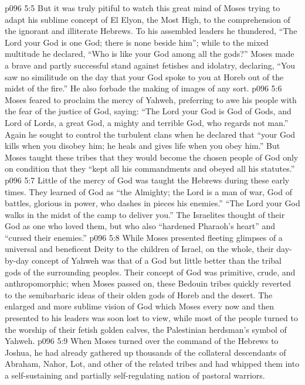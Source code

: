 \vs p096 5:5 \pc But it was truly pitiful to watch this great mind of Moses trying to adapt his sublime concept of El Elyon, the Most High, to the comprehension of the ignorant and illiterate Hebrews. To his assembled leaders he thundered, “The Lord your God is one God; there is none beside him”; while to the mixed multitude he declared, “Who is like your God among all the gods?” Moses made a brave and partly successful stand against fetishes and idolatry, declaring, “You saw no similitude on the day that your God spoke to you at Horeb out of the midst of the fire.” He also forbade the making of images of any sort.
\vs p096 5:6 Moses feared to proclaim the mercy of Yahweh, preferring to awe his people with the fear of the justice of God, saying: “The Lord your God is God of Gods, and Lord of Lords, a great God, a mighty and terrible God, who regards not man.” Again he sought to control the turbulent clans when he declared that “your God kills when you disobey him; he heals and gives life when you obey him.” But Moses taught these tribes that they would become the chosen people of God only on condition that they “kept all his commandments and obeyed all his statutes.”
\vs p096 5:7 Little of the mercy of God was taught the Hebrews during these early times. They learned of God as “the Almighty; the Lord is a man of war, God of battles, glorious in power, who dashes in pieces his enemies.” “The Lord your God walks in the midst of the camp to deliver you.” The Israelites thought of their God as one who loved them, but who also “hardened Pharaoh’s heart” and “cursed their enemies.”
\vs p096 5:8 While Moses presented fleeting glimpses of a universal and beneficent Deity to the children of Israel, on the whole, their day\hyp{}by\hyp{}day concept of Yahweh was that of a God but little better than the tribal gods of the surrounding peoples. Their concept of God was primitive, crude, and anthropomorphic; when Moses passed on, these Bedouin tribes quickly reverted to the semibarbaric ideas of their olden gods of Horeb and the desert. The enlarged and more sublime vision of God which Moses every now and then presented to his leaders was soon lost to view, while most of the people turned to the worship of their fetish golden calves, the Palestinian herdsman’s symbol of Yahweh.
\vs p096 5:9 \pc When Moses turned over the command of the Hebrews to Joshua, he had already gathered up thousands of the collateral descendants of Abraham, Nahor, Lot, and other of the related tribes and had whipped them into a self\hyp{}sustaining and partially self\hyp{}regulating nation of pastoral warriors.
